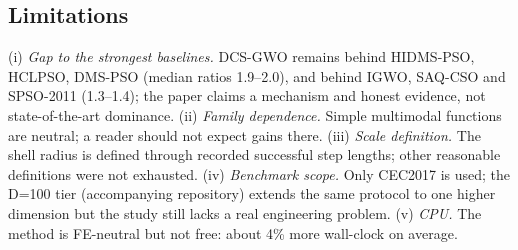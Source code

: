 \documentclass[journal]{IEEEtran}
\newcommand{\method}{DCS-GWO}
\begin{document}
\subsection{Limitations}
(i) \emph{Gap to the strongest baselines.} \method{} remains behind
HIDMS-PSO, HCLPSO, DMS-PSO (median ratios 1.9--2.0), and behind IGWO,
SAQ-CSO and SPSO-2011 (1.3--1.4); the paper claims a mechanism and honest
evidence, not state-of-the-art dominance. (ii) \emph{Family dependence.}
Simple multimodal functions are neutral; a reader should not expect gains
there. (iii) \emph{Scale definition.} The shell radius is defined through
recorded successful step lengths; other reasonable definitions were not
exhausted. (iv) \emph{Benchmark scope.} Only CEC2017 is used; the D=100
tier (accompanying repository) extends the same protocol to one higher
dimension but the study still lacks a real engineering problem.
(v) \emph{CPU.} The method is FE-neutral but not free: about 4\% more
wall-clock on average.


\end{document}
